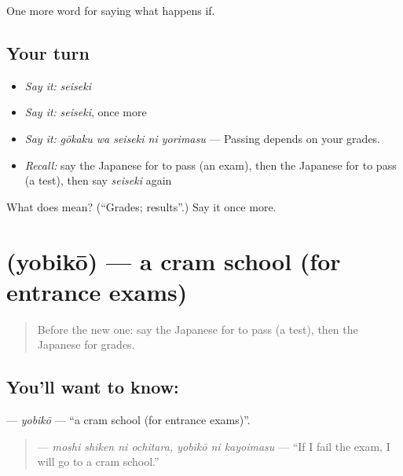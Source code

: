 \begin{grammarlens}[title={What you've built}]
One more word for saying what happens if.
\end{grammarlens}

\subsection*{Your turn}
\begin{itemize}
\raggedright
  \item \emph{Say it:} \emph{seiseki}
  \item \emph{Say it:} \emph{seiseki}, once more
  \item \emph{Say it:} \emph{gōkaku wa seiseki ni yorimasu} — Passing depends on your grades.
  \item \emph{Recall:} say the Japanese for to pass (an exam), then the Japanese for to pass (a test), then say \emph{seiseki} again
\end{itemize}

\begin{tcolorbox}[breakable,colback=teal!4,colframe=teal!35!black,title={Before you move on}]
What does  mean? (\textquotedblleft{}Grades; results\textquotedblright{}.) Say it once more.
\end{tcolorbox}
\section[\texorpdfstring{\ja{よびこう} (yobikō)}{よびこう (yobikō)}]{ (yobikō) — a cram school (for entrance exams)}

\label{lesson:JA-C515-yobikou}



\begin{quote}
Before the new one: say the Japanese for to pass (a test), then the Japanese for grades.
\end{quote}

\subsection*{You'll want to know: }
\textbf{} — \emph{yobikō} — \textquotedblleft{}a cram school (for entrance exams)\textquotedblright{}.

\begin{quote}
\textbf{   } — \emph{moshi shiken ni ochitara, yobikō ni kayoimasu} — \textquotedblleft{}If I fail the exam, I will go to a cram school.\textquotedblright{}
\end{quote}

